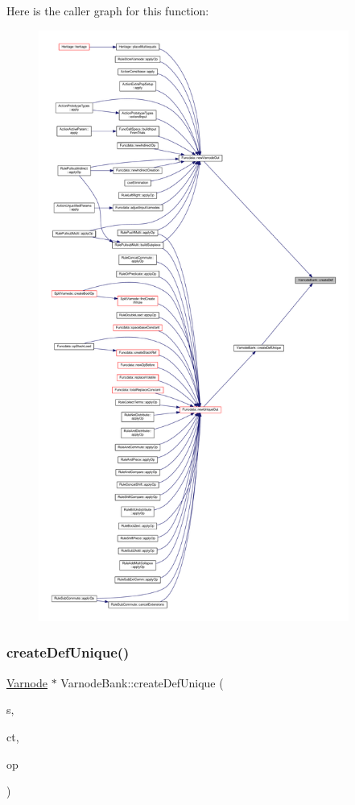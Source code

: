 Here is the caller graph for this function\+:
\nopagebreak
\begin{figure}[H]
\begin{center}
\leavevmode
\includegraphics[height=550pt]{class_varnode_bank_a8acd91c7c2d886e404e531996f7962eb_icgraph}
\end{center}
\end{figure}
\mbox{\label{class_varnode_bank_a9b47054374533bec02c4b467b390b6ca}} 
\subsubsection{\texorpdfstring{createDefUnique()}{createDefUnique()}}
{\footnotesize\ttfamily \mbox{\hyperlink{class_varnode}{Varnode}} $\ast$ Varnode\+Bank\+::create\+Def\+Unique (\begin{DoxyParamCaption}\item[{int4}]{s,  }\item[{\mbox{\hyperlink{class_datatype}{Datatype}} $\ast$}]{ct,  }\item[{\mbox{\hyperlink{class_pcode_op}{Pcode\+Op}} $\ast$}]{op }\end{DoxyParamCaption})}



